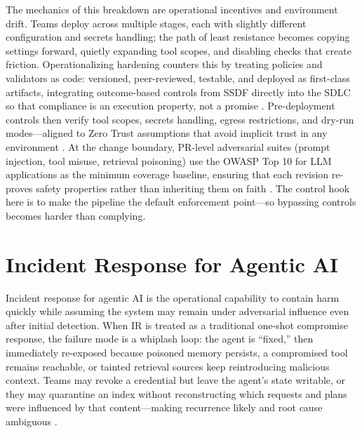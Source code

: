 \begin{TNtwocol}
  The mechanics of this breakdown are operational incentives and environment drift. Teams deploy across multiple stages, each with slightly different configuration and secrets handling; the path of least resistance becomes copying settings forward, quietly expanding tool scopes, and disabling checks that create friction. Operationalizing hardening counters this by treating policies and validators as code: versioned, peer-reviewed, testable, and deployed as first-class artifacts, integrating outcome-based controls from SSDF directly into the SDLC so that compliance is an execution property, not a promise \cite{nist-sp800-218,nist-sp800-53b}. Pre-deployment controls then verify tool scopes, secrets handling, egress restrictions, and dry-run modes—aligned to Zero Trust assumptions that avoid implicit trust in any environment \cite{nist-sp800-207,cisa-ztmm-v2}. At the change boundary, PR-level adversarial suites (prompt injection, tool misuse, retrieval poisoning) use the OWASP Top 10 for LLM applications as the minimum coverage baseline, ensuring that each revision re-proves safety properties rather than inheriting them on faith \cite{owasp-top10-llm-2025,owasp-prompt-injection-cheatsheet}. The control hook here is to make the pipeline the default enforcement point—so bypassing controls becomes harder than complying.

  \section{Incident Response for Agentic AI}

  Incident response for agentic AI is the operational capability to contain harm quickly while assuming the system may remain under adversarial influence even after initial detection. When IR is treated as a traditional one-shot compromise response, the failure mode is a whiplash loop: the agent is “fixed,” then immediately re-exposed because poisoned memory persists, a compromised tool remains reachable, or tainted retrieval sources keep reintroducing malicious context. Teams may revoke a credential but leave the agent's state writable, or they may quarantine an index without reconstructing which requests and plans were influenced by that content—making recurrence likely and root cause ambiguous \cite{cisa-ztmm-v2,owasp-top10-llm-2025}.


\end{TNtwocol}
